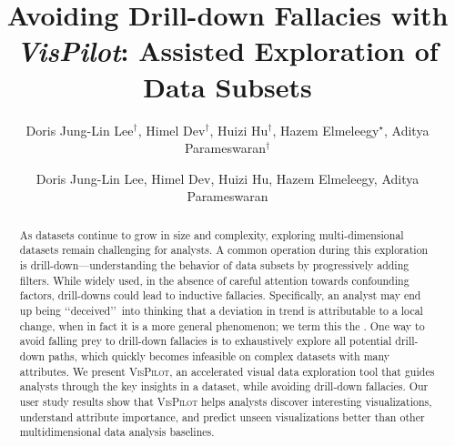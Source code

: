 \documentclass[sigchi]{acmart}
\newcommand{\system}{\textsc{VisPilot}\xspace}
\newcommand{\change}[1]{{\leavevmode\color{red}#1}}
\begin{document}
\author{Doris Jung-Lin Lee$^\dagger$, Himel Dev$^\dagger$, Huizi Hu$^\dagger$, Hazem Elmeleegy$^\star$, Aditya Parameswaran$^\dagger$}




\title{Avoiding Drill-down Fallacies with {\em VisPilot}: Assisted Exploration of Data Subsets}
\begin{abstract}
As datasets continue to grow in size and complexity,
exploring multi-dimensional datasets remain challenging for analysts.
A common operation during this exploration is drill-down---understanding
the behavior of data subsets by \change{progressively} adding filters.
While widely used, in the absence of careful attention towards confounding factors,
drill-downs could lead to inductive fallacies.
Specifically, an analyst may end up being \lq\lq deceived\rq\rq\ into thinking that a deviation in trend is attributable to a local change, when in fact \change{it is a more general phenomenon};
we term this the \change{{\em drill-down fallacy}}.
\change{One way to avoid falling prey to drill-down fallacies}
is to exhaustively explore all potential drill-down paths,
which quickly becomes infeasible \change{on complex datasets with many attributes}.
We present \system, an accelerated visual data exploration tool that guides analysts
\change{through the} key insights in a dataset, while avoiding drill-down fallacies.
Our user study results show that \system helps analysts discover
interesting visualizations, understand attribute importance,
and predict unseen visualizations better than other \change{multidimensional data analysis} baselines.
\end{abstract}
\maketitle
 \author{Doris Jung-Lin Lee, Himel Dev, Huizi Hu, Hazem Elmeleegy, Aditya Parameswaran}
\end{document}
